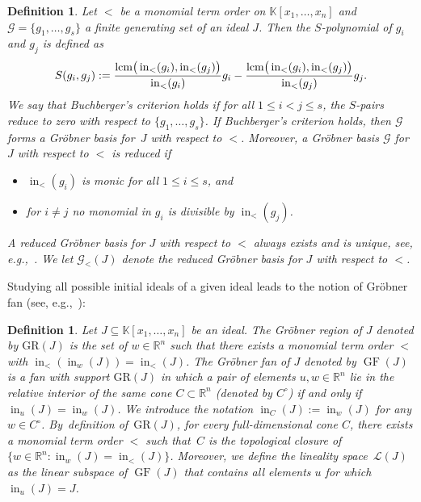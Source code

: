 \documentclass[10pt,a4paper]{amsart}
\newcommand{\thlabel}[1]{\label{#1}}
\newtheorem{Definition}[Theorem]{Definition}
\numberwithin{equation}{section}
\DeclareMathOperator{\init}{in}
\DeclareMathOperator{\GF}{GF}
\begin{document}
\begin{Definition}
Let $<$ be a monomial term order on $\mathbb K[x_1, \dots , x_n]$ and $\mathcal{G}=\{g_1,\ldots,g_s\}$ a finite generating set of an ideal $J$.
Then the {\it $S$-polynomial} of $g_i$ and $g_j$ is defined as
\begin{displaymath}
S(g_i,g_j):=\frac{{\rm lcm}\big(\init_{<}(g_i),\init_{<}(g_j)\big)}{\init_{<}(g_i)}g_i-\frac{{\rm lcm}\big(\init_{<}(g_i),\init_{<}(g_j)\big)}{\init_{<}(g_j)}g_j.
\end{displaymath}
We say that {\it Buchberger's criterion} holds if for all $1\le i<j\le s$, the $S$-pairs reduce to zero with respect to $\{g_1,\dots,g_s\}$.
If Buchberger's criterion holds, then $\mathcal{G}$ forms a Gr\"obner basis for~$J$ with respect to $< $.
Moreover, a Gr\"obner basis $\mathcal{G}$ for $J$ with respect to $<$ is {\it reduced} if
\begin{itemize}\itemsep=0pt
 \item[$(i)$] $\init_<(g_i)$ is monic for all $1\leq i\leq s$, and
\item[$(ii)$] for $i\neq j$ no monomial in $g_i$ is divisible by $\init_<(g_j)$.
\end{itemize}
A reduced Gr\"obner basis for $J$ with respect to $<$ always exists and is unique, see, e.g.,~\cite[Theorem~2.2.7]{herzog2011monomial}.
We let $\mathcal{G}_{<}(J)$ denote the reduced Gr\"obner basis for $J$ with respect to $<$.
\end{Definition}



Studying all possible initial ideals of a given ideal leads to the notion of Gr\"obner fan (see, e.g.,~\cite[Proposition 2.4]{GB_Bernd}):

\begin{Definition}\thlabel{def:Gfan}
Let $J\subseteq \mathbb K[x_1, \dots , x_n]$ be an ideal.
The {\it Gr\"obner region} of $J$ denoted by $\text{GR}(J)$ is the set of $w\in \mathbb R^n$ such that there exists a monomial term order $<$ with $\init_<(\init_w(J))=\init_<(J)$.
The {\it Gr\"obner fan} of $J$ denoted by $\GF(J)$ is a fan with support $\text{GR}(J)$ in which a pair of elements $u,w\in \mathbb R^n$ lie in the relative interior of the same cone $C\subset \mathbb R^n$ (denoted by $C^\circ$) if and only if $\init_u(J)=\init_w(J)$.
We introduce the notation $\init_C(J):=\init_w(J)$ for any $w\in C^\circ$.
By~definition of~$\text{GR}(J)$,
for every full-dimensional cone $C$, there exists a monomial term order $<$ such that~$C$ is the topological closure of $\{w\in \mathbb{R}^n\colon \init_w(J)=\init_<(J)\}$.
Moreover, we define the {\it lineality space}~$\mathcal L(J)$ as the linear subspace of $\GF(J)$ that contains all elements $u$ for which $\init_u(J)=J$.
\end{Definition}
\end{document}
